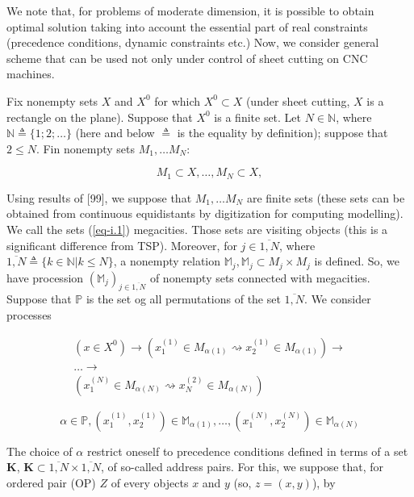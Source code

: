 \documentclass{article}
\begin{document}
We note that,
for problems of moderate dimension,
it is possible to obtain optimal solution taking into account
the essential part of real constraints
(precedence conditions,
dynamic constraints etc.)
Now,
we consider general scheme that can be used not only
under control of sheet cutting on CNC machines.

Fix nonempty sets
$X$ and $X^0$
for which
$X^0 \subset X$
(under sheet cutting,
$X$ is a rectangle on the plane).
Suppose that
$X^0$ is a finite set.
Let
$N \in \mathbb N$,
where
$\mathbb N \triangleq \{1; 2; \dots \}$
(here and below
$\triangleq$
is the equality by definition);
suppose that
$2 \leqslant N$.
Fin nonempty sets
$M_1, \dots M_N$:

\begin{equation}
  \label{eq-i.1}
  M_1 \subset X,
  \dots ,
  M_N \subset X,
\end{equation}

Using results of
[99],  %
we suppose that
$M_1, \dots M_N$
are finite sets
(these sets can be obtained from
continuous equidistants by digitization
for computing modelling).
We call the sets
(\ref{eq-i.1})
megacities.
Those sets are visiting objects
(this is a significant difference from TSP).
Moreover,
for
$j \in \overline{1, N}$,
where
$\overline{1,N} \triangleq \{k \in \mathbb N|k \leqslant N\}$,
a nonempty relation
$\mathbb M_j,
\mathbb M_j \subset M_j \times M_j$
is defined.
So, we have procession
$(\mathbb M_j)_{j \in \overline{1,N}}$
of nonempty sets connected with megacities.
Suppose that
$\mathbb P$
is the set og all permutations of the set
$\overline{1,N}$.
We consider processes

\begin{align*}
  (x\in X^0) \to
  (x_1^{(1)} \in M_{\alpha(1)} \rightsquigarrow x_2^{(1)} \in M_{\alpha(1)}) \to \\
  \dots \to \\
  (x_1^{(N)} \in M_{\alpha(N)} \rightsquigarrow x_N^{(2)} \in M_{\alpha(N)})
\end{align*}

\begin{equation}
  \label{eq-i.2}
  \alpha \in \mathbb P,
  (x_1^{(1)}, x_2^{(1)}) \in \mathbb M_{\alpha(1)},
  \dots ,
  (x_1^{(N)}, x_2^{(N)}) \in \mathbb M_{\alpha(N)}
\end{equation}

The choice of
$\alpha$
restrict oneself to precedence conditions defined in terms of a set
$\mathbf K$,
$\mathbf K \subset \overline{1,N} \times \overline{1,N}$,
of so-called address pairs.
For this,
we suppose that,
for ordered pair (OP)
$Z$
of every objects
$x$ and $y$
(so,
$z=(x,y)$),
by
\end{document}
